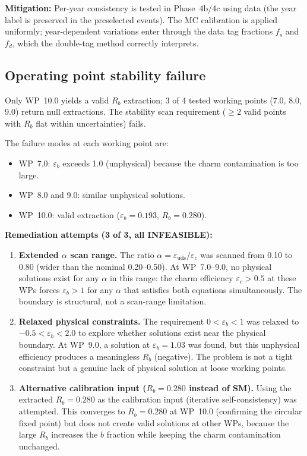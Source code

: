 \documentclass[11pt,a4paper]{article}
\begin{document}
\textbf{Mitigation:} Per-year consistency is tested in Phase~4b/4c using data (the
year label is preserved in the preselected events). The MC calibration is applied
uniformly; year-dependent variations enter through the data tag fractions $f_s$ and
$f_d$, which the double-tag method correctly interprets.

\subsection{Operating point stability failure}

Only WP~10.0 yields a valid $R_b$ extraction; 3 of 4 tested working points
(7.0, 8.0, 9.0) return null extractions. The stability scan requirement
($\geq 2$ valid points with $R_b$ flat within uncertainties) fails.

The failure modes at each working point are:
\begin{itemize}
\item WP~7.0: $\varepsilon_b$ exceeds 1.0 (unphysical) because the charm
contamination is too large.
\item WP~8.0 and 9.0: similar unphysical solutions.
\item WP~10.0: valid extraction ($\varepsilon_b = 0.193$, $R_b = 0.280$).
\end{itemize}

\textbf{Remediation attempts (3 of 3, all INFEASIBLE):}

\begin{enumerate}
\item \textbf{Extended $\alpha$ scan range.} The ratio
$\alpha = \varepsilon_\mathrm{uds}/\varepsilon_c$ was scanned from 0.10 to 0.80
(wider than the nominal 0.20--0.50). At WP~7.0--9.0, no physical solutions exist for
any $\alpha$ in this range: the charm efficiency $\varepsilon_c > 0.5$ at these WPs
forces $\varepsilon_b > 1$ for any $\alpha$ that satisfies both equations
simultaneously. The boundary is structural, not a scan-range limitation.

\item \textbf{Relaxed physical constraints.} The requirement
$0 < \varepsilon_b < 1$ was relaxed to $-0.5 < \varepsilon_b < 2.0$ to explore
whether solutions exist near the physical boundary. At WP~9.0, a solution at
$\varepsilon_b = 1.03$ was found, but this unphysical efficiency produces a
meaningless $R_b$ (negative). The problem is not a tight constraint but a genuine
lack of physical solution at loose working points.

\item \textbf{Alternative calibration input ($R_b = 0.280$ instead of SM).}
Using the extracted $R_b = 0.280$ as the calibration input (iterative self-consistency)
was attempted. This converges to $R_b = 0.280$ at WP~10.0 (confirming the circular
fixed point) but does not create valid solutions at other WPs, because the large
$R_b$ increases the $b$ fraction while keeping the charm contamination unchanged.
\end{enumerate}
\end{document}
